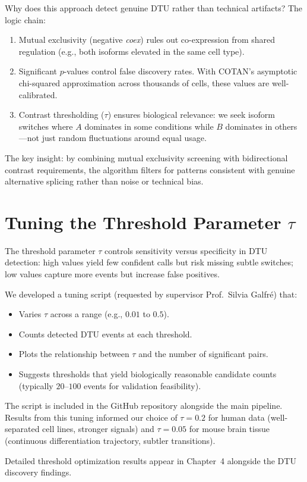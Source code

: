 Why does this approach detect genuine DTU rather than technical artifacts? The logic chain:

\begin{enumerate}
    \item Mutual exclusivity (negative \textit{coex}) rules out co-expression from shared regulation (e.g., both isoforms elevated in the same cell type).
    \item Significant $p$-values control false discovery rates. With COTAN's asymptotic chi-squared approximation across thousands of cells, these values are well-calibrated.
    \item Contrast thresholding ($\tau$) ensures biological relevance: we seek isoform switches where $A$ dominates in some conditions while $B$ dominates in others---not just random fluctuations around equal usage.
\end{enumerate}

The key insight: by combining mutual exclusivity screening with bidirectional contrast requirements, the algorithm filters for patterns consistent with genuine alternative splicing rather than noise or technical bias.

\section{Tuning the Threshold Parameter \texorpdfstring{$\tau$}{tau}}\label{sec:tuning-tau}

The threshold parameter $\tau$ controls sensitivity versus specificity in DTU detection: high values yield few confident calls but risk missing subtle switches; low values capture more events but increase false positives.

We developed a tuning script (requested by supervisor Prof.\ Silvia Galfr\'e) that:

\begin{itemize}
    \item Varies $\tau$ across a range (e.g., $0.01$ to $0.5$).
    \item Counts detected DTU events at each threshold.
    \item Plots the relationship between $\tau$ and the number of significant pairs.
    \item Suggests thresholds that yield biologically reasonable candidate counts (typically $20$--$100$ events for validation feasibility).
\end{itemize}

The script is included in the GitHub repository alongside the main pipeline. Results from this tuning informed our choice of $\tau = 0.2$ for human data (well-separated cell lines, stronger signals) and $\tau = 0.05$ for mouse brain tissue (continuous differentiation trajectory, subtler transitions).

Detailed threshold optimization results appear in Chapter~4 alongside the DTU discovery findings.